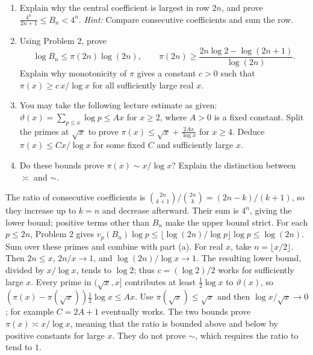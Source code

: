 \studentbreak
{}
\begin{enumerate}
 \item Explain why the central coefficient is largest in row $2n$, and prove
 $\frac{4^n}{2n+1}\le B_n<4^n$.
 \emph{Hint:} Compare consecutive coefficients and sum the row. 
 \item Using Problem 2, prove
 \[
 \log B_n\le\pi(2n)\log(2n),\qquad
 \pi(2n)\ge\frac{2n\log2-\log(2n+1)}{\log(2n)}.
 \]
 Explain why monotonicity of $\pi$ gives a constant $c>0$ such that
 $\pi(x)\ge c\,x/\log x$ for all sufficiently large real $x$.
 \item You may take the following lecture estimate as given:
 $\vartheta(x)=\sum_{p\le x}\log p\le Ax$ for $x\ge2$, where $A>0$
 is a fixed constant. Split the primes at $\sqrt{x}$ to prove
 $\pi(x)\le\sqrt{x}+\frac{2Ax}{\log x}$ for $x\ge4$.
 Deduce $\pi(x)\le Cx/\log x$ for some fixed $C$ and sufficiently large $x$.
 \item Do these bounds prove $\pi(x)\sim x/\log x$? Explain the distinction
 between $\asymp$ and $\sim$. 
\end{enumerate}
\begin{solution}
The ratio of consecutive coefficients is
$\binom{2n}{k+1}/\binom{2n}{k}=(2n-k)/(k+1)$, so they increase up to
$k=n$ and decrease afterward. Their sum is $4^n$, giving the lower
bound; positive terms other than $B_n$ make the upper bound strict.
For each $p\le2n$, Problem 2 gives
$v_p(B_n)\log p\le\lfloor\log(2n)/\log p\rfloor\log p\le\log(2n)$.
Sum over these primes and combine with part (a).
For real $x$, take $n=\lfloor x/2\rfloor$. Then $2n\le x$,
$2n/x\to1$, and $\log(2n)/\log x\to1$.
The resulting lower bound, divided by $x/\log x$, tends to $\log2$;
thus $c=(\log2)/2$ works for sufficiently large $x$.
Every prime in $(\sqrt{x},x]$ contributes at least $\tfrac12\log x$ to
$\vartheta(x)$, so
$(\pi(x)-\pi(\sqrt{x}))\tfrac12\log x\le Ax$.
Use $\pi(\sqrt{x})\le\sqrt{x}$ and then
$\log x/\sqrt{x}\to0$; for example $C=2A+1$ eventually works.
The two bounds prove $\pi(x)\asymp x/\log x$, meaning that the ratio is
bounded above and below by positive constants for large $x$.
They do not prove $\sim$, which requires the ratio to tend to $1$.
\end{solution}


